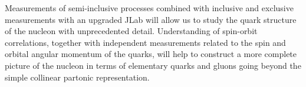 Measurements of semi-inclusive processes combined with inclusive and 
exclusive measurements with an upgraded JLab will allow us to study the quark 
structure of the nucleon with unprecedented detail.  Understanding of 
spin-orbit correlations, together with independent measurements related to the 
spin and orbital angular momentum of the quarks, will help to construct a more 
complete picture of the nucleon in terms of elementary quarks and gluons going 
beyond the simple collinear partonic representation.

